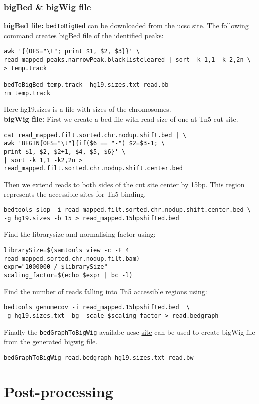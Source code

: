 \documentclass[10pt]{article}
\newcommand{\prog}[1]{\texttt{#1}}
\begin{document}
\subsubsection{bigBed \& bigWig file} 
\textbf{bigBed file:} \prog{bedToBigBed} can be downloaded from the ucsc \href{http://hgdownload.cse.ucsc.edu/admin/exe/}{site}. The following command creates bigBed file of the identified peaks:
\begin{verbatim}
awk '{{OFS="\t"; print $1, $2, $3}}' \
read_mapped_peaks.narrowPeak.blacklistcleared | sort -k 1,1 -k 2,2n \
> temp.track

bedToBigBed temp.track  hg19.sizes.txt read.bb
rm temp.track
\end{verbatim}
Here hg19.sizes is a file with sizes of the chromosomes.\\
\textbf{bigWig file:} First we create a bed file with read size of one at Tn5 cut site.
\begin{verbatim}
cat read_mapped.filt.sorted.chr.nodup.shift.bed | \
awk 'BEGIN{OFS="\t"}{if($6 == "-") $2=$3-1; \
print $1, $2, $2+1, $4, $5, $6}' \
| sort -k 1,1 -k2,2n >  read_mapped.filt.sorted.chr.nodup.shift.center.bed
\end{verbatim}
Then we extend reads to both sides of the cut site center by 15bp. This region represents the accessible sites for Tn5 binding.
\begin{verbatim}
bedtools slop -i read_mapped.filt.sorted.chr.nodup.shift.center.bed \
-g hg19.sizes -b 15 > read_mapped.15bpshifted.bed
\end{verbatim}
Find the librarysize and normalising factor using:
\begin{verbatim}
librarySize=$(samtools view -c -F 4 read_mapped.sorted.chr.nodup.filt.bam)
expr="1000000 / $librarySize"
scaling_factor=$(echo $expr | bc -l)
\end{verbatim}
Find the number of reads falling into Tn5 accessible regions using:
\begin{verbatim}
bedtools genomecov -i read_mapped.15bpshifted.bed  \
-g hg19.sizes.txt -bg -scale $scaling_factor > read.bedgraph
\end{verbatim}
Finally the \prog{bedGraphToBigWig} availabe ucsc \href{http://hgdownload.cse.ucsc.edu/admin/exe/}{site} can be used to create bigWig file from the generated bigwig file.
\begin{verbatim}
bedGraphToBigWig read.bedgraph hg19.sizes.txt read.bw
\end{verbatim}
\section{Post-processing}
\end{document}
